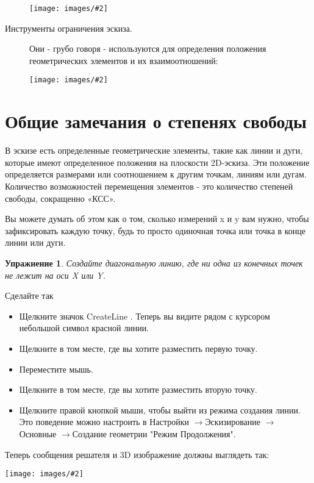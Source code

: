 \documentclass[12pt,titlepage]{article}
\newcommand{\menu}{\mbox{$\rightarrow$}}
\newcommand{\icon}[1]{\raisebox{-1em}{\rule{0pt}{27pt}\texttt{[image: images/\#1]}}}
\newcommand{\img}[2]{\vspace{2ex}\noindent\texttt{[image: images/\#2]}}
\newtheorem{Exercise}{Упражнение}
\begin{document}
\begin{description}
\hspace*{-\leftmargini}\img{width=\textwidth}{GeomElements}

\item [Инструменты ограничения эскиза.] Они - грубо говоря - используются для определения положения геометрических элементов и их взаимоотношений:

\hspace*{-\leftmargini}\img{width=\textwidth}{Constraints}
\end{description}

\section{Общие замечания о степенях свободы}
В эскизе есть определенные геометрические элементы, такие как линии и дуги, которые имеют определенное положения на плоскости 2D-эскиза. Эти положение определяется размерами или соотношением к другим точкам, линиям или дугам. Количество возможностей перемещения элементов - это количество степеней свободы, сокращенно «КСС».

Вы можете думать об этом как о том, сколько измерений x и y вам нужно, чтобы зафиксировать каждую точку, будь то просто одиночная точка или точка в конце линии или дуги.

\pagebreak[3]
\begin{Exercise}
Создайте диагональную линию, где ни одна из конечных точек не лежит на оси X или Y.
\end{Exercise}

Сделайте так
\begin{itemize}
\item Щелкните значок CreateLine \icon{Sketcher_CreateLine}. Теперь вы видите рядом с курсором небольшой символ красной линии.
\item Щелкните в том месте, где вы хотите разместить первую точку.
\item Переместите мышь.
\item Щелкните в том месте, где вы хотите разместить вторую точку.
\item Щелкните правой кнопкой мыши, чтобы выйти из режима создания линии. Это поведение можно настроить в Настройки \menu Эскизирование \menu Основные \menu Создание геометрии "Режим Продолжения".
\end{itemize}

Теперь сообщения решателя и 3D изображение должны выглядеть так:

\img{scale=0.9}{Exercise1}
\end{document}
